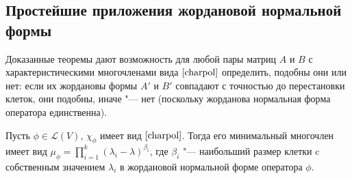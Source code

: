 \subsection{Простейшие приложения жордановой нормальной формы}

\begin{note}
	Доказанные теоремы дают возможность для любой пары матриц $A$ и $B$ с характеристическими многочленами вида $\eqref*{charpol}$ определить, подобны они или нет: если их жордановы формы $A'$ и $B'$ совпадают с точностью до перестановки клеток, они подобны, иначе "--- нет (поскольку жорданова нормальная форма оператора единственна).
\end{note}

\begin{proposition}
	Пусть $\phi \in \mathcal{L}(V)$, $\chi_\phi$ имеет вид $\eqref*{charpol}$. Тогда его минимальный многочлен имеет вид $\mu_\phi = \prod_{i = 1}^{k}(\lambda_i - \lambda)^{\beta_i}$,
	где $\beta_i$ "--- наибольший размер клетки c собственным значением $\lambda_i$ в жордановой нормальной форме оператора $\phi$.
\end{proposition}


